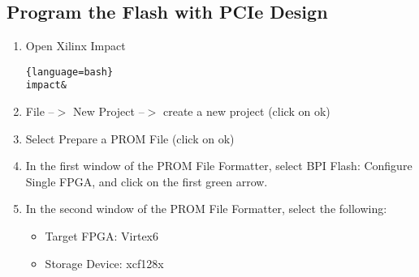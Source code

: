 \subsection{Program the Flash with PCIe Design}
\begin{enumerate}

\item Open Xilinx Impact

\begin{lstlisting}{language=bash}
impact&
\end{lstlisting}

\item File --$>$ New Project --$>$ create a new project (click on ok)
\item Select Prepare a PROM File (click on ok)
\item In the first window of the PROM File Formatter, select BPI Flash: Configure Single FPGA, and click on the first green arrow.
\item In the second window of the PROM File Formatter, select the following:
\begin{itemize}

\item Target FPGA: Virtex6
\item Storage Device: xcf128x


\end{itemize}
\end{enumerate}
